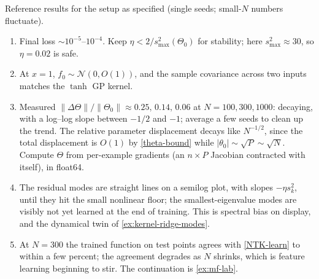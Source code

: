 \documentclass[11pt]{article}
\newcommand{\CN}{{\mathcal N}}
\begin{document}
\begin{solution}
Reference results for the setup as specified (single seeds; small-$N$ numbers fluctuate).
\begin{enumerate}
  \item Final loss $\sim10^{-5}$--$10^{-4}$. Keep $\eta<2/s_{\max}^2(\Theta_0)$ for stability; here $s^2_{\max}\approx30$, so $\eta=0.02$ is safe.
  \item At $x=1$, $f_0\sim\CN(0,O(1))$, and the sample covariance across two inputs matches the $\tanh$ GP kernel.
  \item Measured $\|\Delta\Theta\|/\|\Theta_0\|\approx0.25,\,0.14,\,0.06$ at $N=100,300,1000$: decaying, with a log--log slope between $-1/2$ and $-1$; average a few seeds to clean up the trend. The relative parameter displacement decays like $N^{-1/2}$, since the total displacement is $O(1)$ by \eqref{theta-bound} while $|\theta_0|\sim\sqrt{P}\sim\sqrt N$. Compute $\Theta$ from per-example gradients (an $n\times P$ Jacobian contracted with itself), in float64.
  \item The residual modes are straight lines on a semilog plot, with slopes $-\eta s_k^2$, until they hit the small nonlinear floor; the smallest-eigenvalue modes are visibly not yet learned at the end of training. This is spectral bias on display, and the dynamical twin of \cref{ex:kernel-ridge-modes}.
  \item At $N=300$ the trained function on test points agrees with \eqref{NTK-learn} to within a few percent; the agreement degrades as $N$ shrinks, which is feature learning beginning to stir. The continuation is \cref{ex:mf-lab}.
\end{enumerate}
\end{solution}
\end{document}
